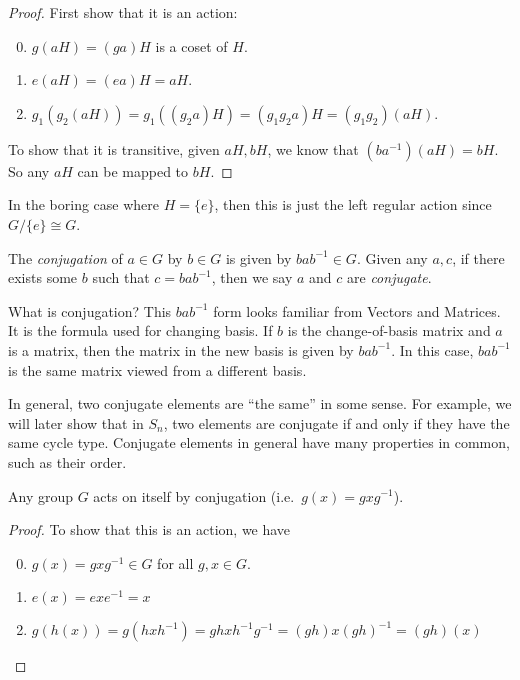 \documentclass[a4paper]{article}
\begin{document}
\begin{proof}
  First show that it is an action:
  \begin{enumerate}[label=\arabic{*}.]
      \setcounter{enumi}{-1}
    \item $g(aH) = (ga)H$ is a coset of $H$.
    \item $e(aH) = (ea)H = aH$.
    \item $g_1(g_2(aH)) = g_1((g_2a)H) = (g_1g_2a)H = (g_1g_2)(aH)$.
  \end{enumerate}

  To show that it is transitive, given $aH, bH$, we know that $(ba^{-1})(aH) = bH$. So any $aH$ can be mapped to $bH$.
\end{proof}
In the boring case where $H = \{e\}$, then this is just the left regular action since $G/\{e\} \cong G$.

\begin{defi}
  The \emph{conjugation} of $a\in G$ by $b\in G$ is given by $bab^{-1}\in G$. Given any $a, c$, if there exists some $b$ such that $c = bab^{-1}$, then we say $a$ and $c$ are \emph{conjugate}.
\end{defi}
What is conjugation? This $bab^{-1}$ form looks familiar from Vectors and Matrices. It is the formula used for changing basis. If $b$ is the change-of-basis matrix and $a$ is a matrix, then the matrix in the new basis is given by $bab^{-1}$. In this case, $bab^{-1}$ is the same matrix viewed from a different basis.

In general, two conjugate elements are ``the same'' in some sense. For example, we will later show that in $S_n$, two elements are conjugate if and only if they have the same cycle type. Conjugate elements in general have many properties in common, such as their order.

\begin{lemma}
  Any group $G$ acts on itself by conjugation (i.e.\ $g(x) = gxg^{-1}$).
\end{lemma}

\begin{proof}
  To show that this is an action, we have
  \begin{enumerate}[label=\arabic{*}.]
      \setcounter{enumi}{-1}
    \item $g(x) = gxg^{-1} \in G$ for all $g, x\in G$.
    \item $e(x) = exe^{-1} = x$
    \item $g(h(x)) = g(hxh^{-1}) = ghxh^{-1}g^{-1} = (gh)x(gh)^{-1} = (gh)(x)$\qedhere
  \end{enumerate}
\end{proof}
\end{document}
